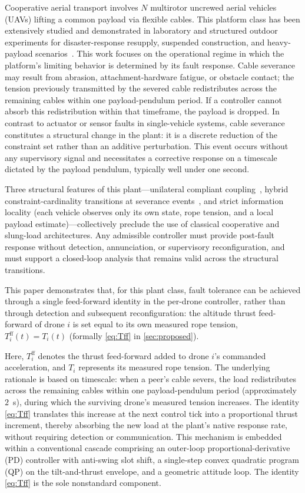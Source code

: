 Cooperative aerial transport involves $N$ multirotor uncrewed aerial vehicles (UAVs) lifting a common payload via flexible cables. This platform class has been extensively studied and demonstrated in laboratory and structured outdoor experiments for disaster-response resupply, suspended construction, and heavy-payload scenarios~\cite{Michael2011, Fink2011, Bernard2011, Tagliabue2019}. This work focuses on the operational regime in which the platform's limiting behavior is determined by its fault response. Cable severance may result from abrasion, attachment-hardware fatigue, or obstacle contact; the tension previously transmitted by the severed cable redistributes across the remaining cables within one payload-pendulum period. If a controller cannot absorb this redistribution within that timeframe, the payload is dropped. In contrast to actuator or sensor faults in single-vehicle systems, cable severance constitutes a structural change in the plant: it is a discrete reduction of the constraint set rather than an additive perturbation. This event occurs without any supervisory signal and necessitates a corrective response on a timescale dictated by the payload pendulum, typically well under one second.

Three structural features of this plant—unilateral compliant coupling~\cite{Brogliato2016}, hybrid constraint-cardinality transitions at severance events~\cite{GoebelSanfeliceTeel2012}, and strict information locality (each vehicle observes only its own state, rope tension, and a local payload estimate)—collectively preclude the use of classical cooperative and slung-load architectures. Any admissible controller must provide post-fault response without detection, annunciation, or supervisory reconfiguration, and must support a closed-loop analysis that remains valid across the structural transitions.

This paper demonstrates that, for this plant class, fault tolerance can be achieved through a single feed-forward identity in the per-drone controller, rather than through detection and subsequent reconfiguration: the altitude thrust feed-forward of drone $i$ is set equal to its own measured rope tension, $T_i^{\mathrm{ff}}(t) = T_i(t)$ (formally \eqref{eq:Tff} in \cref{sec:proposed}).

Here, $T_i^{\mathrm{ff}}$ denotes the thrust feed-forward added to drone $i$'s commanded acceleration, and $T_i$ represents its measured rope tension. The underlying rationale is based on timescale: when a peer's cable severs, the load redistributes across the remaining cables within one payload-pendulum period (approximately $2$~s), during which the surviving drone's measured tension increases. The identity \eqref{eq:Tff} translates this increase at the next control tick into a proportional thrust increment, thereby absorbing the new load at the plant's native response rate, without requiring detection or communication. This mechanism is embedded within a conventional cascade comprising an outer-loop proportional-derivative (PD) controller with anti-swing slot shift, a single-step convex quadratic program (QP) on the tilt-and-thrust envelope, and a geometric attitude loop. The identity \eqref{eq:Tff} is the sole nonstandard component.

